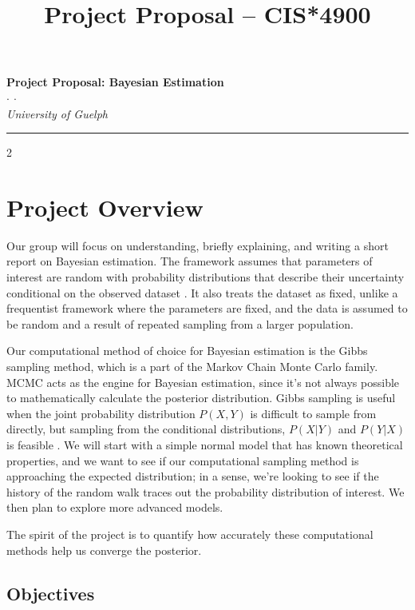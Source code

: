 \documentclass[10pt]{article}
\author{}
\title{Project Proposal -- CIS*4900}
\begin{document}
	
	\begin{center}
		{\Large \textbf{Project Proposal: Bayesian Estimation}}\\
		\vspace{1em}
		\textit{ $\cdot$  $\cdot$ }\\
		\vspace{1em}
		\textit{University of Guelph}
	\end{center}
	

	\begin{center}
		\rule{150mm}{0.2mm}
	\end{center}		

	
\begin{multicols*}{2}
 
\section{Project Overview} 
Our group will focus on understanding, briefly explaining, and writing
a short report on Bayesian estimation. The framework assumes that parameters
of interest are random with probability distributions that describe their
uncertainty conditional on the observed dataset \cite{rizzo_statistical_2019}.
It also treats the dataset as fixed, unlike a frequentist framework where the
parameters are fixed, and the data is assumed to be random and a result of
repeated sampling from a larger population.

Our computational method of choice for Bayesian estimation is the Gibbs
sampling method, which is a part of the Markov Chain Monte Carlo family.
MCMC acts as the engine for Bayesian estimation, since it’s not always possible
to mathematically calculate the posterior distribution. Gibbs sampling is
useful when the joint probability distribution $P(X, Y )$ is difficult to
sample from directly, but sampling from the conditional distributions, $P(X|Y )$
and $P(Y |X)$ is feasible \cite{noauthor_gibbs_nodate}. We will start with a simple normal model that has known
theoretical properties, and we want to see if our computational sampling method
is approaching the expected distribution; in a sense, we’re looking to see if 
the history of the random walk traces out the probability distribution of 
interest. We then plan to explore more advanced models. 

The spirit of the project is to quantify how accurately these computational 
methods help us converge the posterior.

\subsection*{Objectives}

\end{multicols*}
\end{document}
